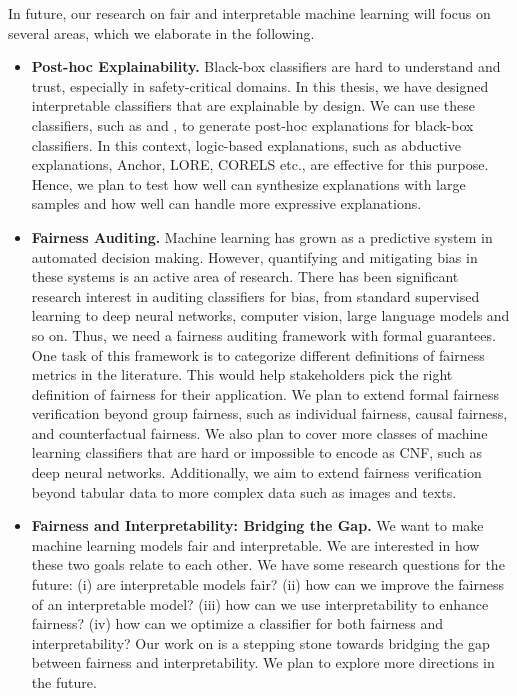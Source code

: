 In future, our research on fair and interpretable machine learning will focus on several areas, which we elaborate in the following.

\begin{itemize}
	\item 
	\textbf{Post-hoc Explainability.} Black-box classifiers are hard to understand and trust, especially in safety-critical domains. In this thesis, we have designed interpretable classifiers that are explainable by design. We can use these classifiers, such as {\imli} and {\crr}, to generate post-hoc explanations for black-box classifiers. In this context, logic-based explanations, such as abductive explanations, Anchor, LORE, CORELS etc., are effective for this purpose. Hence, we plan to test how well {\imli} can synthesize explanations with large samples and how well {\crr} can handle more expressive explanations.
	
	
	\item \textbf{Fairness Auditing.} Machine learning has grown as a predictive system in automated decision making. However, quantifying and mitigating bias in these systems is an active area of research. There has been significant research interest in auditing classifiers for bias, from standard supervised learning to deep neural networks, computer vision, large language models and so on. Thus, we need a fairness auditing framework with formal guarantees. One task of this framework is to categorize different definitions of fairness metrics in the literature. This would help stakeholders pick the right definition of fairness for their application. We plan to extend formal fairness verification beyond group fairness, such as individual fairness, causal fairness, and counterfactual fairness. We also plan to cover more classes of machine learning classifiers that are hard or impossible to encode as CNF, such as deep neural networks. Additionally, we aim to extend fairness verification beyond tabular data to more complex data such as images and texts.
	
	
	\item \textbf{Fairness and Interpretability: Bridging the Gap.} We want to make machine learning models fair and interpretable. We are interested in how these two goals relate to each other. We have some research questions for the future: (i) are interpretable models fair? (ii) how can we improve the fairness of an interpretable model? (iii) how can we use interpretability to enhance fairness? (iv) how can we optimize a classifier for both fairness and interpretability? Our work on {\fairXplainer} is a stepping stone towards bridging the gap between fairness and interpretability. We plan to explore more directions in the future.
	

\end{itemize}
